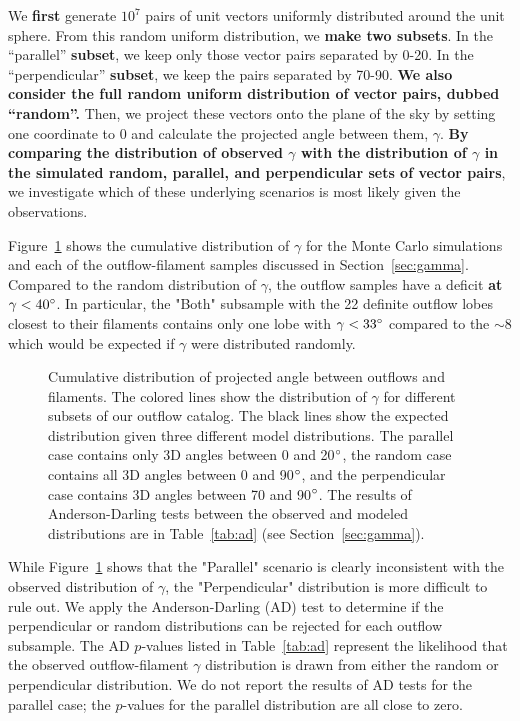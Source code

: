\documentclass[twocolumn]{aastex63}
\begin{document}
We \textbf{first} generate $10^7$ pairs of unit vectors uniformly distributed around the unit sphere. From this random uniform distribution, we \textbf{make two subsets}. In the ``parallel'' \textbf{subset}, we keep only those vector pairs separated by 0-20\degr. In the ``perpendicular'' \textbf{subset}, we keep the pairs separated by 70-90\degr. \textbf{We also consider the full random uniform distribution of vector pairs, dubbed ``random''.} Then, we project these vectors onto the plane of the sky by setting one coordinate to 0 and calculate the projected angle between them, $\gamma$. \textbf{By comparing the distribution of observed $\gamma$ with the distribution of $\gamma$ in the simulated random, parallel, and perpendicular sets of vector pairs}, we investigate which of these underlying scenarios is most likely given the observations.

Figure~\ref{fig:gamma_cdf} shows the cumulative distribution of $\gamma$ for the Monte Carlo simulations and each of the outflow-filament samples discussed in Section~\ref{sec:gamma}. Compared to the random distribution of $\gamma$, the outflow samples have a deficit \textbf{at} $\gamma < 40\mbox{$^\circ$}$. In particular, the "Both" subsample with the 22 definite outflow lobes closest to their filaments contains only one lobe with $\gamma < 33\mbox{$^\circ$}$ compared to the $\sim8$ which would be expected if $\gamma$ were distributed randomly.

\begin{figure}
\caption{Cumulative distribution of projected angle between outflows and filaments. The colored lines show the distribution of $\gamma$ for different subsets of our outflow catalog. The black lines show the expected distribution given three different model distributions. The parallel case contains only 3D angles between 0 and 20$\mbox{$^\circ$}$, the random case contains all 3D angles between 0 and 90$\mbox{$^\circ$}$, and the perpendicular case contains 3D angles between 70 and 90$\mbox{$^\circ$}$. The results of Anderson-Darling tests between the observed and modeled distributions are in Table~\ref{tab:ad} (see Section~\ref{sec:gamma}).\label{fig:gamma_cdf}}
\end{figure}


While Figure~\ref{fig:gamma_cdf} shows that the "Parallel" scenario is clearly inconsistent with the observed distribution of $\gamma$, the "Perpendicular" distribution is more difficult to rule out. We apply the Anderson-Darling (AD) test \citep{Stephens74} to determine if the perpendicular or random distributions can be rejected for each outflow subsample. The AD $p$-values listed in Table~\ref{tab:ad} represent the likelihood that the observed outflow-filament $\gamma$ distribution is drawn from either the random or perpendicular distribution. We do not report the results of AD tests for the parallel case; the $p$-values for the parallel distribution are all close to zero.
\end{document}

